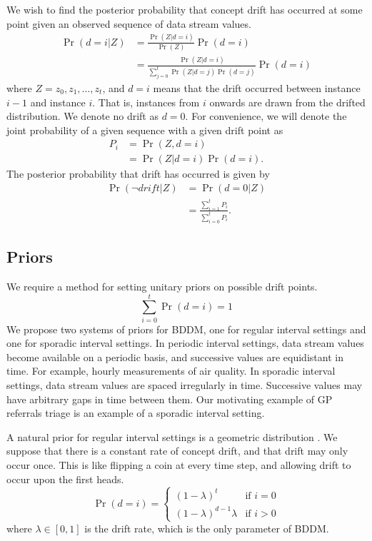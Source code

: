 We wish to find the posterior probability that concept drift has occurred at some point given an observed sequence of data stream values.
\begin{align}
  \Pr(d=i|Z) &= \frac{\Pr(Z|d=i)}{\Pr(Z)}\Pr(d=i) \\
  &= \frac{\Pr(Z|d=i)}{\sum_{j=0}^t\Pr(Z|d=j)\Pr(d=j)}\Pr(d=i) \label{eq:posterior}
\end{align}
where $Z=z_0,z_1,\dots,z_t$, and $d=i$ means that the drift occurred between instance $i-1$ and instance $i$. That is, instances from $i$ onwards are drawn from the drifted distribution. We denote no drift as $d=0$. For convenience, we will denote the joint probability of a given sequence with a given drift point as
\begin{align}
  P_i &= \Pr(Z, d=i) \\
  &= \Pr(Z|d=i)\Pr(d=i).
\end{align}
The posterior probability that drift has occurred is given by
\begin{align}
  \Pr(\neg drift|Z) &= \Pr(d=0|Z) \\
  &= \frac{\sum_{i=1}^t P_i}{\sum_{i=0}^t P_i}.
\end{align}

\subsection{Priors}

We require a method for setting unitary priors on possible drift points.
\begin{equation}
  \sum_{i=0}^t \Pr(d=i) = 1
\end{equation}
We propose two systems of priors for BDDM, one for regular interval settings and one for sporadic interval settings. In periodic interval settings, data stream values become available on a periodic basis, and successive values are equidistant in time. For example, hourly measurements of air quality. In sporadic interval settings, data stream values are spaced irregularly in time. Successive values may have arbitrary gaps in time between them. Our motivating example of GP referrals triage is an example of a sporadic interval setting.

A natural prior for regular interval settings is a geometric distribution \cite{fearnhead}\cite{BCMC}. We suppose that there is a constant rate of concept drift, and that drift may only occur once. This is like flipping a coin at every time step, and allowing drift to occur upon the first heads.
\begin{equation}
  \Pr(d=i) = \begin{cases}
  (1-\lambda)^t & \text{if }i=0 \\
  (1-\lambda)^{d-1}\lambda & \text{if }i>0
  \end{cases}
\end{equation}
where $\lambda \in [0,1]$ is the drift rate, which is the only parameter of BDDM.

